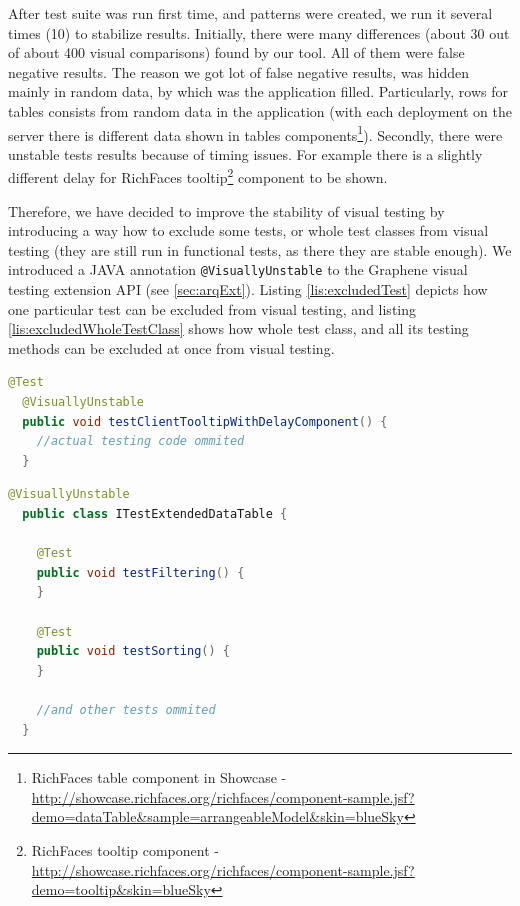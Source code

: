 \documentclass[11pt,oneside,final]{fithesis2}
\begin{document}
  After test suite was run first time, and patterns were created, we run it several times (10) to stabilize results. Initially, there
  were many differences (about 30 out of about 400 visual comparisons) found by our tool. All of them were false negative results. 
  The reason we got lot of false negative results, was hidden mainly in random data, by which was the application filled. 
  Particularly, rows for tables consists from random data in the application (with each deployment on the server there is 
  different data shown in tables 
  components\footnote{RichFaces table component in Showcase - 
  \url{http://showcase.richfaces.org/richfaces/component-sample.jsf?demo=dataTable&sample=arrangeableModel&skin=blueSky}}). 
  Secondly, there were unstable tests results because of timing issues. For example there is a slightly different delay for RichFaces
  tooltip\footnote{RichFaces tooltip component - 
  \url{http://showcase.richfaces.org/richfaces/component-sample.jsf?demo=tooltip&skin=blueSky}} component to be shown.
  
  Therefore, we have decided to improve the stability of visual testing by introducing a way how to exclude some tests, or whole
  test classes from visual testing (they are still run in functional tests, as there they are stable enough). We introduced
  a JAVA annotation \texttt{@VisuallyUnstable} to the Graphene visual testing extension API (see \ref{sec:arqExt}). 
  Listing \ref{lis:excludedTest} depicts how one particular test can be excluded from visual testing, 
  and listing \ref{lis:excludedWholeTestClass} shows how whole test class, and all its testing methods can be excluded at once
  from visual testing.
  
  \begin{lstlisting}[caption=Exclude functional test from visual testing by annotating it with @VisuallyUnstable,label=lis:excludedTest,language=java]
  @Test
  @VisuallyUnstable
  public void testClientTooltipWithDelayComponent() {
    //actual testing code ommited
  }
  \end{lstlisting}

  \begin{lstlisting}[caption=Exclude whole test class from visual testing by annotating it with @VisuallyUnstable,label=lis:excludedWholeTestClass,language=java]
  @VisuallyUnstable
  public class ITestExtendedDataTable {
    
    @Test
    public void testFiltering() {
    }
    
    @Test
    public void testSorting() {
    }
    
    //and other tests ommited
  }
  \end{lstlisting}
  
\end{document}
